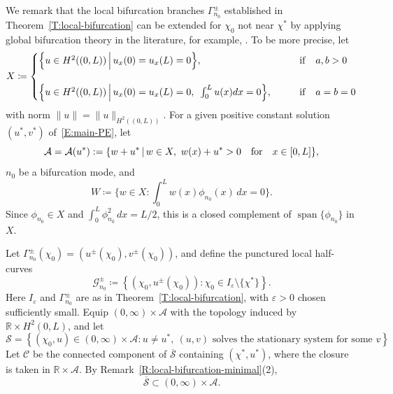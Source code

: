 \documentclass[11pt]{article} %
\theoremstyle{remark}
\theoremstyle{remark}
\numberwithin{equation}{section}
\numberwithin{figure}{section}
\numberwithin{table}{section}
\begin{document}
We remark that the local bifurcation branches $\Gamma_{n_0}^\pm$ established in
Theorem~\ref{T:local-bifurcation} can be extended for $\chi_0$ not near $\chi^*$
by applying global bifurcation theory in the literature, for example,
\cite[Theorem~4.4]{shi.wang:09:on}. To be more precise, let
\begin{equation}\label{E:X-eq}
  X \coloneqq
  \begin{cases}
    \Big\{
    u\in H^2((0,L)) \,\Big|\,
    u_x(0)=u_x(L)=0
    \Big\},
    \qquad        & {\rm if}\quad a,b>0\cr\cr
    \Big\{
    u\in H^2((0,L)) \,\Big|\,
    u_x(0)=u_x(L)=0,\,\,\, \int_0^L u(x)dx=0
    \Big\},\qquad & {\rm if}\quad a=b=0
  \end{cases}
\end{equation}
with norm $\|u\| = \|u\|_{H^2((0,L))}$. For a given positive constant solution
$(u^*,v^*)$ of~\eqref{E:main-PE}, let
\begin{equation}\label{E:A-eq}
  \mathcal{A}=\mathcal{A}(u^*):=
  \{w+u^*\,|\, w\in X,\,\, w(x)+u^*>0\quad {\rm for}\quad x\in [0,L]\},
\end{equation}
$n_0$ be a bifurcation mode, and
\[
  W\coloneqq\big\{w\in X:\int_0^L w(x)\phi_{n_0}(x)\,dx=0\big\}.
\]
Since $\phi_{n_0} \in X$ and $\int_0^L\phi_{n_0}^2\,dx = L/2$, this is a closed
complement of $\operatorname{span}\{\phi_{n_0}\}$ in $X$.

Let $\Gamma_{n_0}^{\pm}(\chi_0) = (u^{\pm}(\chi_0),v^{\pm}(\chi_0))$, and
define the punctured local half-curves
\[
  \mathcal{G}_{n_0}^{\pm}
  \coloneqq
  \left\{
  (\chi_0,u^{\pm}(\chi_0)):
  \chi_0\in I_\varepsilon\setminus\{\chi^*\}
  \right\}.
\]
Here $I_\varepsilon$ and $\Gamma_{n_0}^{\pm}$ are as in
Theorem~\ref{T:local-bifurcation}, with $\varepsilon > 0$ chosen sufficiently
small. Equip $(0, \infty)\times\mathcal{A}$ with the topology induced by
$\mathbb{R}\times H^2(0,L)$, and let
\[
  \mathcal{S}
  =
  \left\{
  (\chi_0,u)\in (0,\infty)\times\mathcal{A}:
  u\ne u^*,\
  (u,v)\text{ solves the stationary system for some }v
  \right\}.
\]
Let $\mathcal{C}$ be the connected component of $\overline{\mathcal{S}}$
containing $(\chi^*,u^*)$, where the closure is taken in $\mathbb{R}\times
\mathcal{A}$. By Remark~\ref{R:local-bifurcation-minimal}(2),
\begin{equation}\label{E:closure-S}
  \overline{\mathcal{S}}\subset (0,\infty)\times {\mathcal{A}}.
\end{equation}
\end{document}
